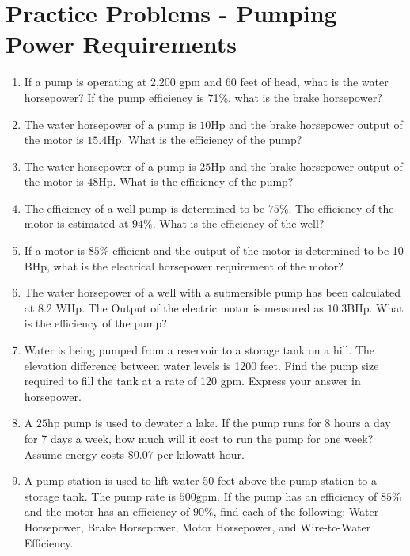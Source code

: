 \section*{Practice Problems - Pumping Power Requirements}
\begin{enumerate}
  \item If a pump is operating at 2,200 gpm and 60 feet of head, what is the water horsepower? If the pump efficiency is 71\%, what is the brake horsepower?

\item The water horsepower of a pump is $10 \mathrm{Hp}$ and the brake horsepower output of the motor is $15.4 \mathrm{Hp}$. What is the efficiency of the pump?

\item The water horsepower of a pump is $25 \mathrm{Hp}$ and the brake horsepower output of the motor is $48 \mathrm{Hp}$. What is the efficiency of the pump?

\item The efficiency of a well pump is determined to be $75 \%$. The efficiency of the motor is estimated at $94 \%$. What is the efficiency of the well?

\item If a motor is $85 \%$ efficient and the output of the motor is determined to be 10 $\mathrm{BHp}$, what is the electrical horsepower requirement of the motor?

\item The water horsepower of a well with a submersible pump has been calculated at 8.2 WHp. The Output of the electric motor is measured as $10.3 \mathrm{BHp}$. What is the efficiency of the pump?

  \item Water is being pumped from a reservoir to a storage tank on a hill. The elevation difference between water levels is 1200 feet. Find the pump size required to fill the tank at a rate of 120 gpm. Express your answer in horsepower.

  \item A $25 \mathrm{hp}$ pump is used to dewater a lake. If the pump runs for 8 hours a day for 7 days a week, how much will it cost to run the pump for one week? Assume energy costs $\$ 0.07$ per kilowatt hour.

  \item A pump station is used to lift water 50 feet above the pump station to a storage tank. The pump rate is $500 \mathrm{gpm}$. If the pump has an efficiency of $85 \%$ and the motor has an efficiency of $90 \%$, find each of the following: Water Horsepower, Brake Horsepower, Motor Horsepower, and Wire-to-Water Efficiency.



\end{enumerate}
